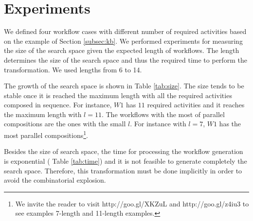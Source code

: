 
\section{Experiments} \label{sec:experiments}

We defined four workflow cases with different number of required activities based on the example of Section \ref{subsec:kb}. We performed experiments for measuring the size of the search space given the expected length of workflows. The length determines the size of the search space and thus the required time to perform the transformation. We used lengths from 6 to 14.

The growth of the search space is shown in Table \ref{tab:size}. The size tends to be stable once it is reached the maximum length with all the required activities composed in sequence. For instance, $W1$ has $11$ required activities and it reaches the maximum length with $l=11$. The workflows with the most of parallel compositions are the ones with the small $l$. For instance with $l=7$, $W1$ has the most parallel compositions\footnote{We invite the reader to visit http://goo.gl/XKZuL and http://goo.gl/z4iu3 to see examples 7-length and 11-length examples.}.




Besides the size of search space, the time for processing the workflow generation is exponential (\cf{} Table \ref{tab:time}) and it is not feasible to generate completely the search space. Therefore, this transformation must be done implicitly in order to avoid the combinatorial explosion.
